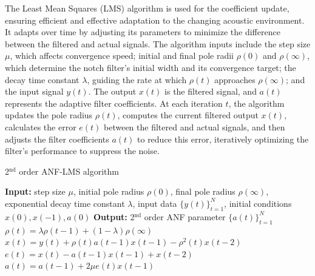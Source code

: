 The Least Mean Squares (LMS) algorithm is used for the coefficient update\cite{vanwaterschoot2014}, ensuring efficient and effective adaptation to the changing acoustic environment. It adapts over time by adjusting its parameters to minimize the difference between the filtered and actual signals. The algorithm inputs include the step size $μ$, which affects convergence speed; initial and final pole radii $\rho(0)$ and $\rho(\infty)$, which determine the notch filter's initial width and its convergence target; the decay time constant $\lambda$, guiding the rate at which $\rho(t)$ approaches $\rho(\infty)$; and the input signal $y(t)$. The output $x(t)$ is the filtered signal, and $a(t)$ represents the adaptive filter coefficients. At each iteration $t$, the algorithm updates the pole radius $\rho(t)$, computes the current filtered output $x(t)$, calculates the error $e(t)$ between the filtered and actual signals, and then adjusts the filter coefficients $a(t)$ to reduce this error, iteratively optimizing the filter's performance to suppress the noise.

\begin{algorithm}
\caption{2$^{\text{nd}}$ order ANF-LMS algorithm}
\begin{algorithmic}[1]
\State \textbf{Input:} step size $\mu$, initial pole radius $\rho(0)$, final pole radius $\rho(\infty)$, exponential decay time constant $\lambda$, input data $\{y(t)\}_{t=1}^N$, initial conditions $x(0), x(-1), a(0)$
\State \textbf{Output:} 2$^{\text{nd}}$ order ANF parameter $\{a(t)\}_{t=1}^N$
    \State $\rho(t) = \lambda \rho(t - 1) + (1 - \lambda) \rho(\infty)$
    \State $x(t) = y(t) + \rho(t) a(t - 1) x(t - 1) - \rho^2(t) x(t - 2)$
    \State $e(t) = x(t) - a(t - 1) x(t - 1) + x(t - 2)$
    \State $a(t) = a(t - 1) + 2 \mu e(t) x(t - 1)$
\EndFor
\end{algorithmic}
\end{algorithm}


